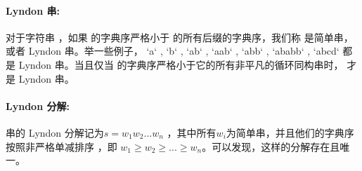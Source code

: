 \paragraph{Lyndon 串:}对于字符串 ，如果 的字典序严格小于 的所有后缀的字典序，我们称 是简单串，或者 Lyndon 串。举一些例子， `a` , `b` , `ab` , `aab` , `abb` , `ababb` , `abcd` 都是 Lyndon 串。当且仅当 的字典序严格小于它的所有非平凡的循环同构串时， 才是 Lyndon 串。
\paragraph{Lyndon 分解:}串的 Lyndon 分解记为$s=w_1 w_2 ...w_n$ ，其中所有$w_i$为简单串，并且他们的字典序按照非严格单减排序 ，即 $w_1{\geq}w_2{\geq}...{\geq}w_n$。可以发现，这样的分解存在且唯一。